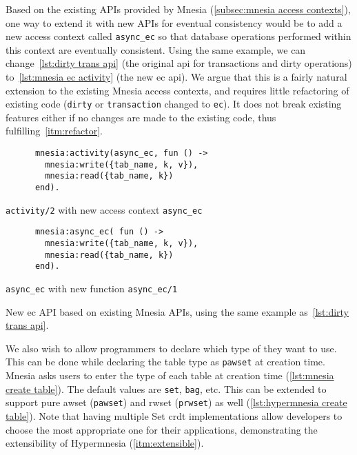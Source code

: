 Based on the existing APIs provided by Mnesia (\cref{subsec:mnesia access contexts}), 
one way to extend it with new APIs for eventual consistency would be to add a
new access context called \texttt{async_ec} so that database operations
performed within this context are eventually consistent. Using
the same example, we can change~\cref{lst:dirty trans api} (the original
\acrshort{api} for transactions and dirty operations) to~\cref{lst:mnesia ec activity} (the
new \acrshort{ec} \acrshort{api}).
We argue that this is a fairly natural extension to the existing Mnesia access contexts,
and requires little refactoring of existing code (\verb|dirty| or \verb|transaction|
changed to \verb|ec|). It does not break existing features either if no changes
are made to the existing code, thus fulfilling~\cref{itm:refactor}.

\begin{listing}[htp]
  \begin{sublisting}{0.46\linewidth}
    \begin{verbatim}
      mnesia:activity(async_ec, fun () -> 
        mnesia:write({tab_name, k, v}),
        mnesia:read({tab_name, k})
      end).
    \end{verbatim}
    \caption{\texttt{activity/2} with new access context \texttt{async\_ec}}
  \end{sublisting}
  \hfill
  \begin{sublisting}{0.46\linewidth}
    \begin{verbatim}
      mnesia:async_ec( fun () -> 
        mnesia:write({tab_name, k, v}),
        mnesia:read({tab_name, k})
      end).
    \end{verbatim}
    \caption{\texttt{async\_ec} with new function \texttt{async\_ec/1}}
  \end{sublisting}
  \caption{New \acrfull{ec} API based on existing Mnesia APIs, using the same
  example as~\cref{lst:dirty trans api}.} 
  \label{lst:mnesia ec activity}
\end{listing}

We also wish to allow programmers to declare which type of  they
want to use. This can be done while declaring the table type as \texttt{pawset}
at creation time. Mnesia asks users to enter the type of each
table at creation time (\cref{lst:mnesia create table}). The default values are 
\texttt{set}, \texttt{bag}, etc. This can be extended
to support pure \acrshort{awset} (\texttt{pawset}) and \acrshort{rwset} (\texttt{prwset}) 
as well 
(\cref{lst:hypermnesia create table}). Note that having multiple Set \acrshort{crdt}
implementations allow developers to choose the most appropriate one for their
applications, demonstrating the extensibility of Hypermnesia (\cref{itm:extensible}).

